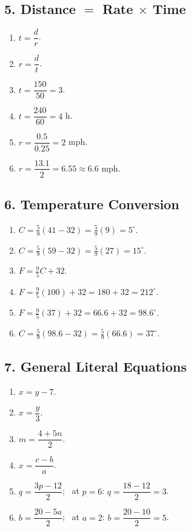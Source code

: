 \documentclass[11pt]{article}
\begin{document}
\subsection*{5. Distance $=$ Rate $\times$ Time}
\begin{enumerate}[label=\arabic*.,leftmargin=2em,itemsep=2pt]
\item $t = \dfrac{d}{r}$.
\item $r = \dfrac{d}{t}$.
\item $t = \dfrac{150}{50} = 3$.
\item $t = \dfrac{240}{60} = 4$ h.
\item $r = \dfrac{0.5}{0.25} = 2$ mph.
\item $r = \dfrac{13.1}{2} = 6.55 \approx 6.6$ mph.
\end{enumerate}

\subsection*{6. Temperature Conversion}
\begin{enumerate}[label=\arabic*.,leftmargin=2em,itemsep=2pt]
\item $C = \tfrac{5}{9}(41 - 32) = \tfrac{5}{9}(9) = 5^\circ$.
\item $C = \tfrac{5}{9}(59 - 32) = \tfrac{5}{9}(27) = 15^\circ$.
\item $F = \tfrac{9}{5}C + 32$.
\item $F = \tfrac{9}{5}(100) + 32 = 180 + 32 = 212^\circ$.
\item $F = \tfrac{9}{5}(37) + 32 = 66.6 + 32 = 98.6^\circ$.
\item $C = \tfrac{5}{9}(98.6 - 32) = \tfrac{5}{9}(66.6) = 37^\circ$.
\end{enumerate}

\subsection*{7. General Literal Equations}
\begin{enumerate}[label=\arabic*.,leftmargin=2em,itemsep=2pt]
\item $x = y - 7$.
\item $x = \dfrac{y}{3}$.
\item $m = \dfrac{4 + 5n}{2}$.
\item $x = \dfrac{c - b}{a}$.
\item $q = \dfrac{3p - 12}{2}$; \ at $p = 6$: $q = \dfrac{18 - 12}{2} = 3$.
\item $b = \dfrac{20 - 5a}{2}$; \ at $a = 2$: $b = \dfrac{20 - 10}{2} = 5$.
\end{enumerate}
\end{document}
